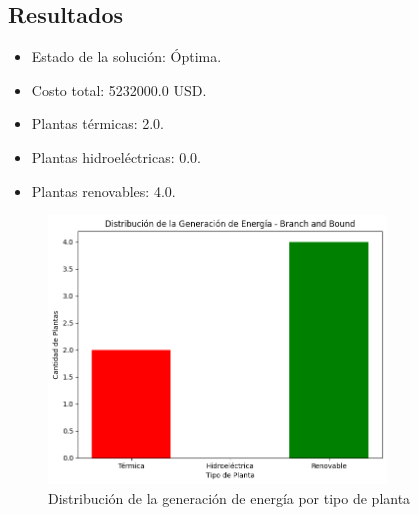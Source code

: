 \documentclass{article}
\begin{document}
\subsection*{Resultados}
\begin{itemize}
    \item Estado de la solución: Óptima.
    \item Costo total: 5232000.0 USD.
    \item Plantas térmicas: 2.0.
    \item Plantas hidroeléctricas: 0.0.
    \item Plantas renovables: 4.0.
\end{itemize} 

\begin{figure}[H]
    \centering
    \includegraphics[width=0.8\textwidth]{BranchAndBound.png}
\caption{Distribución de la generación de energía por tipo de planta}
\end{figure}
\end{document}
